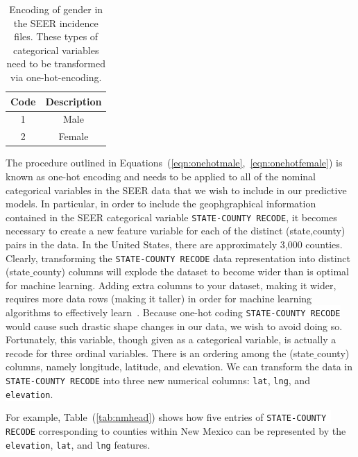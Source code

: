 \documentclass[a4paper,11pt]{article}
\newcommand{\codewhite}[1]{\colorbox{white}{\texttt{#1}}}
\begin{document}
\begin{table}[tbp]
\begin{center}
\begin{tabular}{cc}
\toprule
Code & Description \\ 
\midrule
1 & Male \\  
2 & Female \\  
\bottomrule
\end{tabular}
\caption{\label{tab:sex} Encoding of gender in the SEER incidence files. These types of categorical variables need to be transformed via one-hot-encoding.}
\end{center}
\end{table}


The procedure outlined in Equations~(\ref{eqn:onehotmale},~\ref{eqn:onehotfemale}) is known as one-hot encoding 
and needs to be applied to all of the nominal categorical variables in the SEER data that we wish to include in our predictive models.
In particular, in order to include the geophgraphical information contained in the SEER categorical variable \codewhite{STATE-COUNTY RECODE}, it becomes necessary to create a new feature variable for each of the distinct (state,county) pairs in the data. In the United States, there are approximately 3,000 counties. Clearly, transforming the \codewhite{STATE-COUNTY RECODE} data representation into distinct (state$\_$county) columns will explode the dataset to become wider than is optimal for machine learning. Adding extra columns to your dataset, making it wider, requires more data rows (making it taller) in order for machine learning algorithms to effectively learn~\cite{bowles}. Because one-hot coding \codewhite{STATE-COUNTY RECODE} would cause such drastic shape changes in our data, we wish to avoid doing so. Fortunately, this variable, though given as a categorical variable, is actually a recode for three ordinal variables. There is an ordering among the (state$\_$county) columns, namely longitude, latitude, and elevation. We can transform the data in \codewhite{STATE-COUNTY RECODE} into three new numerical columns: \codewhite{lat}, \codewhite{lng}, and \codewhite{elevation}.

For example, Table~(\ref{tab:nmhead}) shows how five entries of \codewhite{STATE-COUNTY RECODE} corresponding to counties within New Mexico can be represented by the 
\codewhite{elevation}, \codewhite{lat}, and \codewhite{lng} features.
\end{document}

